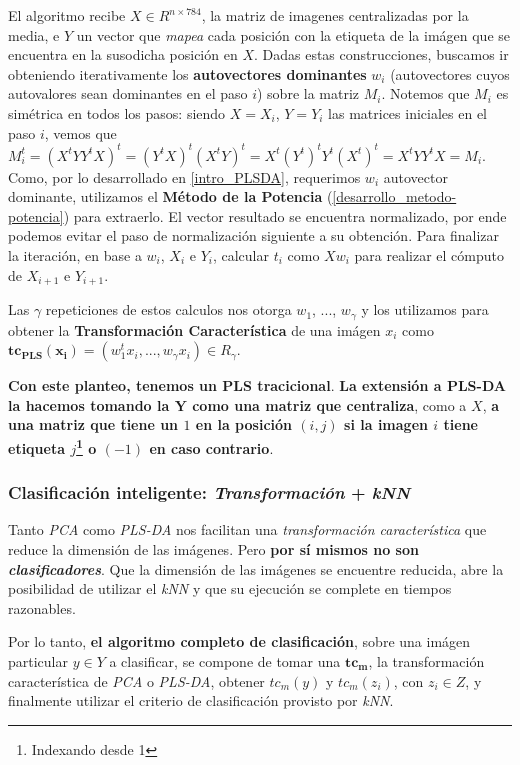 El algoritmo recibe $X \in R^{n \times 784}$, la matriz de imagenes centralizadas por la media, e $Y$ un vector que \textit{mapea} cada posici\'on con la etiqueta de la im\'agen que se encuentra en la susodicha posici\'on en $X$. Dadas estas construcciones, buscamos ir obteniendo iterativamente los \textbf{autovectores dominantes} $w_{i}$ (autovectores cuyos autovalores sean dominantes en el paso $i$) sobre la matriz $M_{i}$. Notemos que $M_{i}$ es sim\'etrica en todos los pasos: siendo $X = X_{i}$, $Y = Y_{i}$ las matrices iniciales en el paso $i$, vemos que $M_{i}^{t} = (X^{t}YY^{t}X)^{t} = (Y^{t}X)^{t}(X^{t}Y)^{t} = X^{t}(Y^{t})^{t}Y^{t}(X^{t})^{t} = X^{t}YY^{t}X = M_{i}$. Como, por lo desarrollado en \ref{intro_PLSDA}, requerimos $w_{i}$ autovector dominante, utilizamos el \textbf{M\'etodo de la Potencia} (\ref{desarrollo_metodo-potencia}) para extraerlo. El vector resultado se encuentra normalizado, por ende podemos evitar el paso de normalizaci\'on siguiente a su obtenci\'on. Para finalizar la iteraci\'on, en base a $w_{i}$, $X_{i}$ e $Y_{i}$, calcular $t_{i}$ como $Xw_{i}$ para realizar el c\'omputo de $X_{i+1}$ e $Y_{i+1}$.

Las $\gamma$ repeticiones de estos calculos nos otorga $w_{1}$, ..., $w_{\gamma}$ y los utilizamos para obtener la \textbf{Transformaci\'on Caracter\'istica} de una im\'agen $x_{i}$ como $\mathbf{tc_{PLS}(x_{i})} = (w_{1}^{t}x_{i}, ..., w_{\gamma}x_{i}) \in R_{\gamma}$.

\textbf{Con este planteo, tenemos un PLS tracicional}. \textbf{La extensi\'on a PLS-DA la hacemos tomando la $\mathbf{Y}$ como una matriz que centraliza}, como a $X$, \textbf{a una matriz que tiene un $1$ en la posici\'on $(i, j)$ si la imagen $i$ tiene etiqueta $j$\footnote{Indexando desde 1} o $(-1)$ en caso contrario}.

\subsubsection{Clasificaci\'on inteligente: \textit{Transformaci\'on} + \textit{kNN}}

Tanto \textit{PCA} como \textit{PLS-DA} nos facilitan una \textit{transformaci\'on caracter\'istica} que reduce la dimensi\'on de las im\'agenes. Pero \textbf{por s\'i mismos no son \textit{clasificadores}}. Que la dimensi\'on de las im\'agenes se encuentre reducida, abre la posibilidad de utilizar el \textit{kNN} y que su ejecuci\'on se complete en tiempos razonables.

Por lo tanto, \textbf{el algoritmo completo de clasificaci\'on}, sobre una im\'agen particular $y \in Y$ a clasificar, se compone de tomar una $\mathbf{tc_{m}}$, la transformaci\'on caracter\'istica de \textit{PCA} o \textit{PLS-DA}, obtener $tc_{m}(y)$ y $tc_{m}(z_{i})$, con $z_{i} \in Z$, y finalmente utilizar el criterio de clasificaci\'on provisto por \textit{kNN}.

